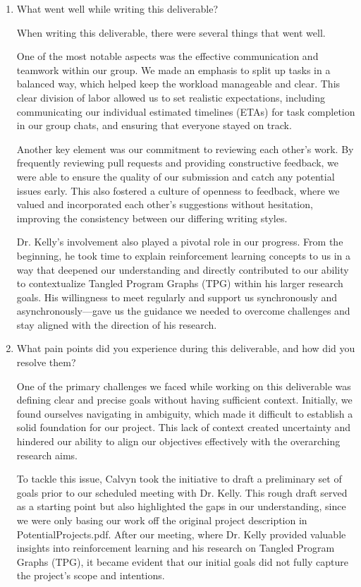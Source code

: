 \documentclass{article}
\begin{document}
\begin{enumerate}
    \item What went well while writing this deliverable? 
    
    When writing this deliverable, there were several things that went well. 

    One of the most notable aspects was the effective communication and teamwork within our group. We made an emphasis to split up tasks in a balanced way, which helped keep the workload manageable and clear. This clear division of labor allowed us to set realistic expectations, including communicating our individual estimated timelines (ETAs) for task completion in our group chats, and ensuring that everyone stayed on track.
    
    Another key element was our commitment to reviewing each other’s work. By frequently reviewing pull requests and providing constructive feedback, we were able to ensure the quality of our submission and catch any potential issues early. This also fostered a culture of openness to feedback, where we valued and incorporated each other's suggestions without hesitation, improving the consistency between our differing writing styles.
    
    Dr. Kelly's involvement also played a pivotal role in our progress. From the beginning, he took time to explain reinforcement learning concepts to us in a way that deepened our understanding and directly contributed to our ability to contextualize Tangled Program Graphs (TPG) within his larger research goals. His willingness to meet regularly and support us synchronously and asynchronously—gave us the guidance we needed to overcome challenges and stay aligned with the direction of his research.    
    
    \item What pain points did you experience during this deliverable, and how
    did you resolve them? 

    One of the primary challenges we faced while working on this deliverable was defining clear and precise goals without having sufficient context. Initially, we found ourselves navigating in ambiguity, which made it difficult to establish a solid foundation for our project. This lack of context created uncertainty and hindered our ability to align our objectives effectively with the overarching research aims. 
    
    To tackle this issue, Calvyn took the initiative to draft a preliminary set of goals prior to our scheduled meeting with Dr. Kelly. This rough draft served as a starting point but also highlighted the gaps in our understanding, since we were only basing our work off the original project description in PotentialProjects.pdf. After our meeting, where Dr. Kelly provided valuable insights into reinforcement learning and his research on Tangled Program Graphs (TPG), it became evident that our initial goals did not fully capture the project's scope and intentions. 
    

\end{enumerate}
\end{document}
